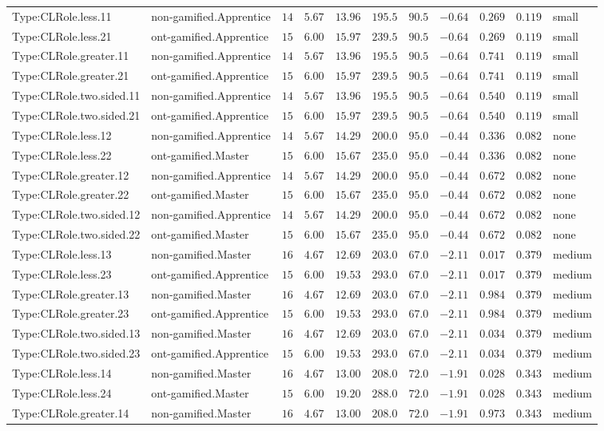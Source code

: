 \documentclass[6pt,a4paper]{article}
\begin{document}
{\begin{longtable}{llrrrrrrrrl}
Type:CLRole.less.11&non-gamified.Apprentice&$14$&$5.67$&$13.96$&$ 195.5$&$ 90.5$&$-0.64$&$0.269$&$0.119$&small\tabularnewline
Type:CLRole.less.21&ont-gamified.Apprentice&$15$&$6.00$&$15.97$&$ 239.5$&$ 90.5$&$-0.64$&$0.269$&$0.119$&small\tabularnewline
Type:CLRole.greater.11&non-gamified.Apprentice&$14$&$5.67$&$13.96$&$ 195.5$&$ 90.5$&$-0.64$&$0.741$&$0.119$&small\tabularnewline
Type:CLRole.greater.21&ont-gamified.Apprentice&$15$&$6.00$&$15.97$&$ 239.5$&$ 90.5$&$-0.64$&$0.741$&$0.119$&small\tabularnewline
Type:CLRole.two.sided.11&non-gamified.Apprentice&$14$&$5.67$&$13.96$&$ 195.5$&$ 90.5$&$-0.64$&$0.540$&$0.119$&small\tabularnewline
Type:CLRole.two.sided.21&ont-gamified.Apprentice&$15$&$6.00$&$15.97$&$ 239.5$&$ 90.5$&$-0.64$&$0.540$&$0.119$&small\tabularnewline
Type:CLRole.less.12&non-gamified.Apprentice&$14$&$5.67$&$14.29$&$ 200.0$&$ 95.0$&$-0.44$&$0.336$&$0.082$&none\tabularnewline
Type:CLRole.less.22&ont-gamified.Master&$15$&$6.00$&$15.67$&$ 235.0$&$ 95.0$&$-0.44$&$0.336$&$0.082$&none\tabularnewline
Type:CLRole.greater.12&non-gamified.Apprentice&$14$&$5.67$&$14.29$&$ 200.0$&$ 95.0$&$-0.44$&$0.672$&$0.082$&none\tabularnewline
Type:CLRole.greater.22&ont-gamified.Master&$15$&$6.00$&$15.67$&$ 235.0$&$ 95.0$&$-0.44$&$0.672$&$0.082$&none\tabularnewline
Type:CLRole.two.sided.12&non-gamified.Apprentice&$14$&$5.67$&$14.29$&$ 200.0$&$ 95.0$&$-0.44$&$0.672$&$0.082$&none\tabularnewline
Type:CLRole.two.sided.22&ont-gamified.Master&$15$&$6.00$&$15.67$&$ 235.0$&$ 95.0$&$-0.44$&$0.672$&$0.082$&none\tabularnewline
Type:CLRole.less.13&non-gamified.Master&$16$&$4.67$&$12.69$&$ 203.0$&$ 67.0$&$-2.11$&$0.017$&$0.379$&medium\tabularnewline
Type:CLRole.less.23&ont-gamified.Apprentice&$15$&$6.00$&$19.53$&$ 293.0$&$ 67.0$&$-2.11$&$0.017$&$0.379$&medium\tabularnewline
Type:CLRole.greater.13&non-gamified.Master&$16$&$4.67$&$12.69$&$ 203.0$&$ 67.0$&$-2.11$&$0.984$&$0.379$&medium\tabularnewline
Type:CLRole.greater.23&ont-gamified.Apprentice&$15$&$6.00$&$19.53$&$ 293.0$&$ 67.0$&$-2.11$&$0.984$&$0.379$&medium\tabularnewline
Type:CLRole.two.sided.13&non-gamified.Master&$16$&$4.67$&$12.69$&$ 203.0$&$ 67.0$&$-2.11$&$0.034$&$0.379$&medium\tabularnewline
Type:CLRole.two.sided.23&ont-gamified.Apprentice&$15$&$6.00$&$19.53$&$ 293.0$&$ 67.0$&$-2.11$&$0.034$&$0.379$&medium\tabularnewline
Type:CLRole.less.14&non-gamified.Master&$16$&$4.67$&$13.00$&$ 208.0$&$ 72.0$&$-1.91$&$0.028$&$0.343$&medium\tabularnewline
Type:CLRole.less.24&ont-gamified.Master&$15$&$6.00$&$19.20$&$ 288.0$&$ 72.0$&$-1.91$&$0.028$&$0.343$&medium\tabularnewline
Type:CLRole.greater.14&non-gamified.Master&$16$&$4.67$&$13.00$&$ 208.0$&$ 72.0$&$-1.91$&$0.973$&$0.343$&medium\tabularnewline

\end{longtable}}
\end{document}
